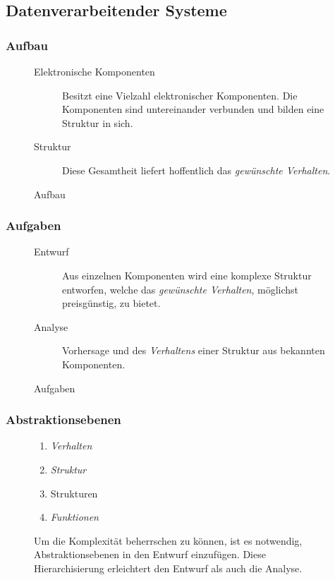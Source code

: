 \documentclass[a4paper]{scrartcl}
\begin{document}
	\subsection{Datenverarbeitender Systeme}
		\subsubsection{Aufbau}
			\begin{figure}[H]
				\begin{description}
					\item [Elektronische Komponenten]
					Besitzt eine Vielzahl elektronischer Komponenten. Die Komponenten sind untereinander verbunden und bilden eine Struktur in sich.
					\item [Struktur] 
					Diese Gesamtheit liefert hoffentlich das \emph{gewünschte Verhalten}.
				\end{description}
			\caption{Aufbau}
			\end{figure}
	\subsubsection{Aufgaben}
		\begin{figure}[H]
			\begin{description}
				\item[Entwurf]
					Aus einzelnen Komponenten wird eine komplexe Struktur entworfen, welche das \emph{gewünschte Verhalten}, möglichst preisgünstig, zu bietet.
				\item[Analyse]
					Vorhersage und des \emph{Verhaltens} einer Struktur aus bekannten Komponenten.
			\end{description}
		\caption{Aufgaben}
		\end{figure}
	
	\subsubsection{Abstraktionsebenen}		
		\begin{figure}[H]
			\begin{enumerate}
				\item \emph{Verhalten} 
				\item \emph{Struktur}
				\item Strukturen
				\item \emph{Funktionen}
			\end{enumerate}
			\caption{Um die Komplexität beherrschen zu können, ist es notwendig, Abstraktionsebenen in den Entwurf einzufügen. Diese Hierarchisierung erleichtert den Entwurf als auch die Analyse.}
		\end{figure}
	
\end{document}

